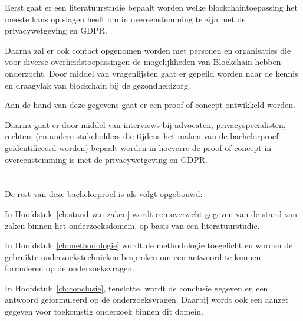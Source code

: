 Eerst gaat er een literatuurstudie bepaalt worden welke blockchaintoepassing het meeste kans op slagen heeft om in overeenstemming te zijn met de privacywetgeving en GDPR. 

Daarna zal er ook contact opgenomen worden met personen en organisaties die voor diverse overheidstoepassingen de mogelijkheden van Blockchain hebben onderzocht. Door middel van vragenlijsten gaat er gepeild worden naar de kennis en draagvlak van blockchain bij de gezondheidzorg. 

Aan de hand van deze gegevens gaat er een proof-of-concept ontwikkeld worden.

Daarna gaat er door middel van interviews bij advocaten, privacyspecialisten, rechters (en andere stakeholders die tijdens het maken van de bachelorproef geïdentificeerd worden) bepaalt worden in hoeverre de proof-of-concept in overeenstemming is met de privacywetgeving en GDPR. 

\section{}
\label{sec:opzet-bachelorproef}


De rest van deze bachelorproef is als volgt opgebouwd:

In Hoofdstuk~\ref{ch:stand-van-zaken} wordt een overzicht gegeven van de stand van zaken binnen het onderzoeksdomein, op basis van een literatuurstudie.

In Hoofdstuk~\ref{ch:methodologie} wordt de methodologie toegelicht en worden de gebruikte onderzoekstechnieken besproken om een antwoord te kunnen formuleren op de onderzoeksvragen.


In Hoofdstuk~\ref{ch:conclusie}, tenslotte, wordt de conclusie gegeven en een antwoord geformuleerd op de onderzoeksvragen. Daarbij wordt ook een aanzet gegeven voor toekomstig onderzoek binnen dit domein.